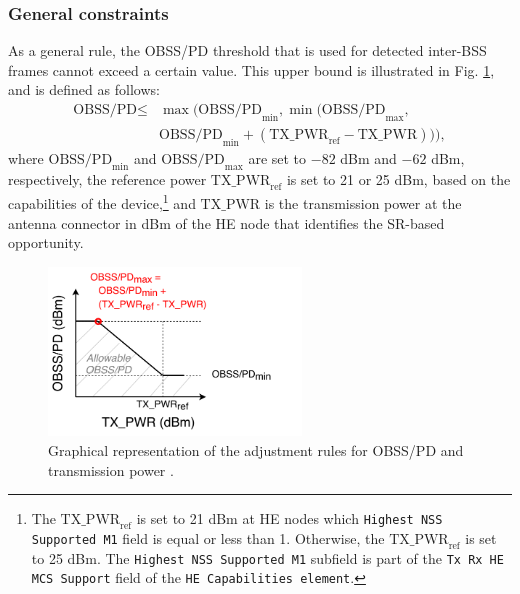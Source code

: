 \documentclass{article}
\begin{document}
\subsubsection{General constraints}
As a general rule, the OBSS/PD threshold that is used for detected inter-BSS frames cannot exceed a certain value. This upper bound is illustrated in Fig. \ref{fig:fig_7}, and is defined as follows:
\begin{align}\nonumber \text{OBSS/PD} \leq & \max\Big(\text{OBSS/PD}_{\min}, \min\big(\text{OBSS/PD}_{\max},\\ & \text{OBSS/PD}_{\min} + (\text{TX\_PWR}_{\text{ref}}-\text{TX\_PWR})\big)\Big), \nonumber \end{align}
where $\text{OBSS/PD}_{\min}$ and $\text{OBSS/PD}_{\max}$ are set to $-82$ dBm and $-62$ dBm, respectively, the reference power $\text{TX\_PWR}_{\text{ref}}$ is set to 21 or 25 dBm, based on the
capabilities of the device,\footnote{The $\text{TX\_PWR}_{\text{ref}}$ is set to 21 dBm at HE nodes which \texttt{Highest NSS Supported M1} field is equal or less than 1. Otherwise, the  $\text{TX\_PWR}_{\text{ref}}$ is set to 25 dBm. The \texttt{Highest NSS Supported M1} subfield is part of the \texttt{Tx Rx HE MCS Support} field of the \texttt{HE Capabilities element}.} and $\text{TX\_PWR}$ is the transmission power at the antenna connector in dBm of the HE node that identifies the SR-based opportunity.
\begin{figure}[ht!]
	\centering
	\includegraphics[width=0.6\textwidth]{fig_10}
	\caption{Graphical representation of the adjustment rules for OBSS/PD and transmission power \cite{tgax2019draft}.}
	\label{fig:fig_7}
\end{figure}
\end{document}
